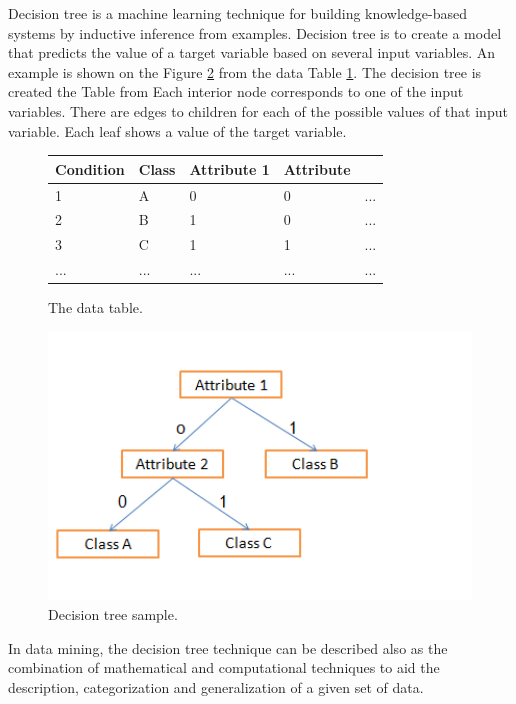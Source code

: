 Decision tree is a machine learning technique for building knowledge-based systems by inductive inference from examples. Decision tree is to create a model that predicts the value of a target variable based on several input variables. An example is shown on the Figure \ref{fig:decisiontreesample} from the data Table \ref{fig:decisiontreesampletable}. The decision tree is created the Table from Each interior node corresponds to one of the input variables. There are edges to children for each of the possible values of that input variable. Each leaf shows a value of the target variable.
\begin{figure}[h!]
  \begin{center}
    \begin{tabular}{ | l | l | l | l | l }
     \hline
    Condition & Class & Attribute 1 &  Attribute \\ \hline
    1 & A & 0 & 0 & ... \\ 
	2 & B & 1 & 0 & ... \\ 
	3 & C & 1 & 1 & ... \\ 
	... & ... & ... & ... & ... \\ 


    \end{tabular}
	\end{center}
     \caption{The data table.}
    \label{fig:decisiontreesampletable}
\end{figure} 
\begin{figure}[httb]
\centering
\includegraphics[width=1\textwidth]{graph/decisiontreesample.png}
\caption{Decision tree sample.}
\label{fig:decisiontreesample}
\end{figure}

In data mining, the decision tree technique can be described also as the combination of mathematical and computational techniques to aid the description, categorization and generalization of a given set of data.

